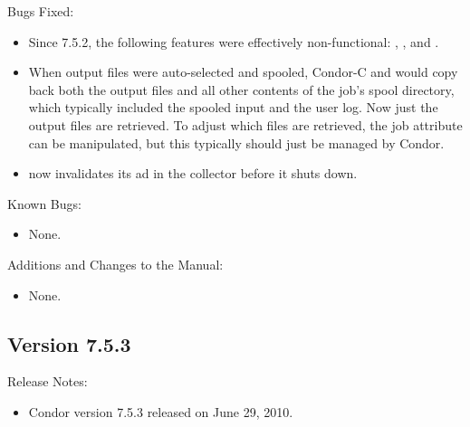\noindent Bugs Fixed:

\begin{itemize}

\item Since 7.5.2, the following  features were
  effectively non-functional: ,
  , and .

\item When output files were auto-selected and spooled, Condor-C and
   would copy back both the output files and
  all other contents of the job's spool directory, which typically
  included the spooled input and the user log.  Now just the output
  files are retrieved.  To adjust which files are retrieved, the job
  attribute  can be manipulated, but this
  typically should just be managed by Condor.

\item {} now invalidates its ad in the collector before it shuts
  down.

\end{itemize}

\noindent Known Bugs:

\begin{itemize}

\item None.

\end{itemize}

\noindent Additions and Changes to the Manual:

\begin{itemize}

\item None.

\end{itemize}


\subsection*{\label{sec:New-7-5-3}Version 7.5.3}

\noindent Release Notes:

\begin{itemize}

\item Condor version 7.5.3 released on June 29, 2010.

\end{itemize}


